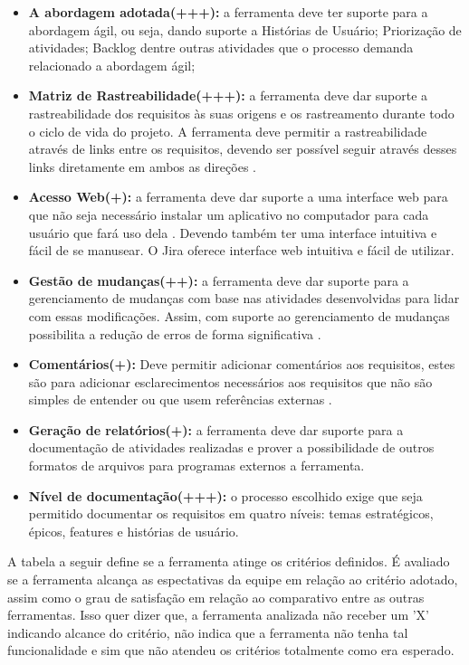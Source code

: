 \begin{itemize}
    \item \textbf{A abordagem adotada(+++):} a ferramenta deve ter suporte para a abordagem ágil, ou seja, dando suporte a Histórias de Usuário; Priorização de atividades; Backlog dentre outras atividades que o processo demanda relacionado a abordagem ágil;     
    \item \textbf{Matriz de Rastreabilidade(+++):} a ferramenta deve dar suporte a rastreabilidade dos requisitos às suas origens e os rastreamento durante todo o ciclo de vida do projeto. A ferramenta deve permitir a rastreabilidade através de links entre os requisitos, devendo ser possível seguir através desses links diretamente em ambos as direções \cite{hoffmann2004}.     
    \item \textbf{Acesso Web(+):} a ferramenta deve dar suporte a uma interface web para que não seja necessário instalar um aplicativo no computador para cada usuário que fará uso dela \cite{hoffmann2004}. Devendo também ter uma interface intuitiva e fácil de se manusear. O Jira oferece interface web intuitiva e fácil de utilizar.
    \item \textbf{Gestão de mudanças(++):} a ferramenta deve dar suporte para a gerenciamento de mudanças com base nas atividades desenvolvidas para lidar com essas modificações. Assim, com suporte ao gerenciamento de mudanças possibilita a redução de erros de forma significativa \cite{hoffmann2004}.
    \item \textbf{Comentários(+):} Deve permitir adicionar comentários aos requisitos, estes são para adicionar esclarecimentos necessários aos requisitos que não são simples de entender ou que usem referências externas \cite{hoffmann2004}.
    \item \textbf{Geração de relatórios(+):} a ferramenta deve dar suporte para a documentação de atividades realizadas e  prover a possibilidade de outros formatos de arquivos para programas externos a ferramenta.
    \item \textbf{Nível de documentação(+++):} o processo escolhido exige que seja permitido documentar os requisitos em quatro níveis: temas estratégicos, épicos, features e histórias de usuário.
\end{itemize}

A tabela a seguir define se a ferramenta atinge os critérios definidos. É avaliado se a ferramenta alcança as espectativas da equipe em relação ao critério adotado, assim como o grau de satisfação em relação ao comparativo entre as outras ferramentas. Isso quer dizer que, a ferramenta analizada não receber um 'X' indicando alcance do critério, não indica que a ferramenta não tenha tal funcionalidade e sim que não atendeu os critérios totalmente como era esperado.

